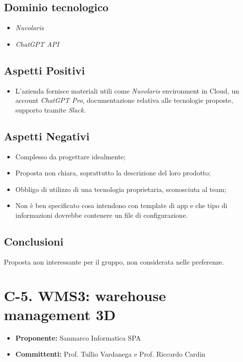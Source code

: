 \documentclass{article}
\begin{document}
\subsection{Dominio tecnologico}
\begin{itemize}
    \item \textit{Nuvolaris}
    \item \textit{ChatGPT API}
\end{itemize}

\subsection{Aspetti Positivi}
\begin{itemize}
    \item L’azienda fornisce materiali utili come \textit{Nuvolaris} environment in Cloud, un account \textit{ChatGPT Pro}, documentazione relativa alle tecnologie proposte, supporto tramite \textit{Slack}.
\end{itemize}

\subsection{Aspetti Negativi}
\begin{itemize}
    \item Complesso da progettare idealmente;
    \item Proposta non chiara, soprattutto la descrizione del loro prodotto;
    \item Obbligo di utilizzo di una tecnologia proprietaria, sconosciuta al team;
    \item Non è ben specificato cosa intendono con template di app e che tipo di informazioni dovrebbe contenere un file di configurazione.
\end{itemize}
\subsection{Conclusioni}
Proposta non interessante per il gruppo, non considerata nelle preferenze.

\newpage

\section{C-5. WMS3: warehouse management 3D}
\begin{itemize}
    \item \textbf{Proponente:} Sanmarco Informatica SPA
    \item \textbf{Committenti:}  Prof. Tullio Vardanega e Prof. Riccardo Cardin
\end{itemize}
\end{document}
